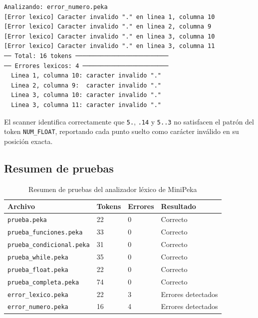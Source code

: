\documentclass[12pt]{article}
\begin{document}
\begin{lstlisting}[caption={Salida — error\_numero.peka}]
Analizando: error_numero.peka
[Error lexico] Caracter invalido "." en linea 1, columna 10
[Error lexico] Caracter invalido "." en linea 2, columna 9
[Error lexico] Caracter invalido "." en linea 3, columna 10
[Error lexico] Caracter invalido "." en linea 3, columna 11
── Total: 16 tokens ──────────────────────────
── Errores lexicos: 4 ────────────────────────
  Linea 1, columna 10: caracter invalido "."
  Linea 2, columna 9:  caracter invalido "."
  Linea 3, columna 10: caracter invalido "."
  Linea 3, columna 11: caracter invalido "."
\end{lstlisting}

\noindent
El scanner identifica correctamente que \texttt{5.}, \texttt{.14} y
\texttt{5..3} no satisfacen el patrón del token \texttt{NUM\_FLOAT},
reportando cada punto suelto como carácter inválido en su posición exacta.

\subsection{Resumen de pruebas}

\begin{table}[H]
\centering
\renewcommand{\arraystretch}{1.25}
\begin{tabular}{@{}p{4.5cm} p{2.0cm} p{2.5cm} p{3.5cm}@{}}
\toprule
\textbf{Archivo} & \textbf{Tokens} &
\textbf{Errores} & \textbf{Resultado} \\
\midrule
\texttt{prueba.peka}            & 22 & 0 & Correcto \\
\texttt{prueba\_funciones.peka} & 33 & 0 & Correcto \\
\texttt{prueba\_condicional.peka} & 31 & 0 & Correcto \\
\texttt{prueba\_while.peka}     & 35 & 0 & Correcto \\
\texttt{prueba\_float.peka}     & 22 & 0 & Correcto \\
\texttt{prueba\_completa.peka}  & 74 & 0 & Correcto \\
\texttt{error\_lexico.peka}     & 22 & 3 & Errores detectados \\
\texttt{error\_numero.peka}     & 16 & 4 & Errores detectados \\
\bottomrule
\end{tabular}
\caption{Resumen de pruebas del analizador léxico de MiniPeka}
\end{table}

\end{document}
